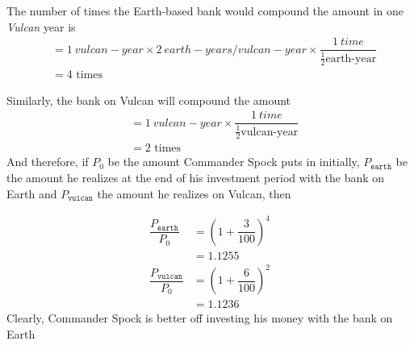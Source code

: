 \begin{solution}[\halfpage]
	The number of times the Earth-based bank would compound the amount in one \textit{Vulcan}
	year is 
	\begin{align}
		&= \SI{1}{vulcan-year}\times\SI{2}{earth-years\per vulcan-year}\times
		\dfrac{\SI{1}{time}}{\frac{1}{2}\text{earth-year}} \\
		&= 4\text{ times}
	\end{align}
	
	Similarly, the bank on Vulcan will compound the amount
	\begin{align}
		&= \SI{1}{vulcan-year}\times\dfrac{\SI{1}{time}}{\frac{1}{2}\text{vulcan-year}} \\
		&= 2\text{ times}
	\end{align}
	And therefore, if $P_0$ be the amount Commander Spock puts in initially, 
	$P_{\texttt{earth}}$ be the amount he realizes at the end of his investment period with the bank
	on Earth and $P_{\texttt{vulcan}}$ the amount he realizes on Vulcan, then 
	
	\begin{align}
		\dfrac{P_\texttt{earth}}{P_0} &= \left( 1 + \dfrac{3}{100}\right)^4 \\
		                       &= 1.1255 \\
		\dfrac{P_\texttt{vulcan}}{P_0} &= \left( 1 + \dfrac{6}{100}\right)^2 \\
		                        &= 1.1236
	\end{align}
	Clearly, Commander Spock is better off investing his
	money with the bank on Earth
\end{solution}
